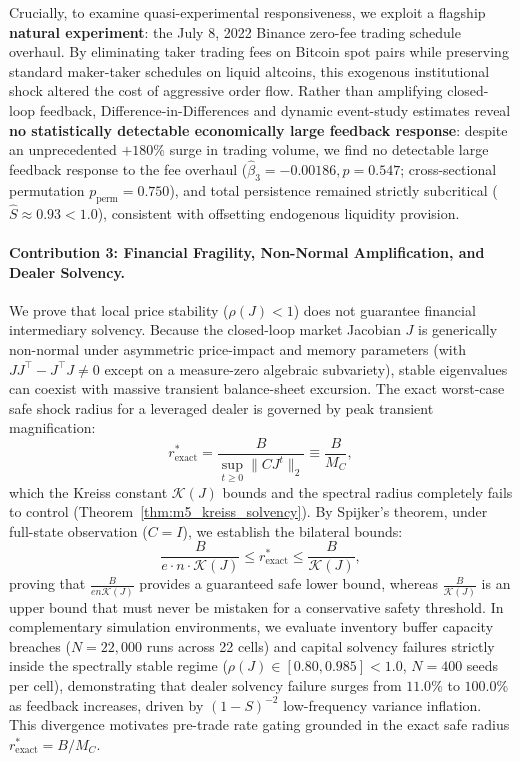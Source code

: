 \documentclass[12pt]{article}
\theoremstyle{definition}
\theoremstyle{remark}
\begin{document}
Crucially, to examine quasi-experimental responsiveness, we exploit a flagship \textbf{natural experiment}: the July 8, 2022 Binance zero-fee trading schedule overhaul. By eliminating taker trading fees on Bitcoin spot pairs while preserving standard maker-taker schedules on liquid altcoins, this exogenous institutional shock altered the cost of aggressive order flow. Rather than amplifying closed-loop feedback, Difference-in-Differences and dynamic event-study estimates reveal \textbf{no statistically detectable economically large feedback response}: despite an unprecedented $+180\%$ surge in trading volume, we find no detectable large feedback response to the fee overhaul ($\hat{\beta}_3 = -0.00186, p = 0.547$; cross-sectional permutation $p_{\text{perm}} = 0.750$), and total persistence remained strictly subcritical ($\hat{S} \approx 0.93 < 1.0$), consistent with offsetting endogenous liquidity provision.

\paragraph{Contribution 3: Financial Fragility, Non-Normal Amplification, and Dealer Solvency.}
We prove that local price stability ($\rho(J) < 1$) does not guarantee financial intermediary solvency. Because the closed-loop market Jacobian $J$ is generically non-normal under asymmetric price-impact and memory parameters (with $J J^\top - J^\top J \neq 0$ except on a measure-zero algebraic subvariety), stable eigenvalues can coexist with massive transient balance-sheet excursion. The exact worst-case safe shock radius for a leveraged dealer is governed by peak transient magnification:
\begin{equation}
r^*_{\text{exact}} = \frac{B}{\sup_{t \ge 0} \|C J^t\|_2} \equiv \frac{B}{M_C},
\end{equation}
which the Kreiss constant $\mathcal{K}(J)$ bounds and the spectral radius completely fails to control (Theorem~\ref{thm:m5_kreiss_solvency}). By Spijker's theorem, under full-state observation ($C = I$), we establish the bilateral bounds:
\begin{equation}
\frac{B}{e \cdot n \cdot \mathcal{K}(J)} \le r^*_{\text{exact}} \le \frac{B}{\mathcal{K}(J)},
\end{equation}
proving that $\frac{B}{e n \mathcal{K}(J)}$ provides a guaranteed safe lower bound, whereas $\frac{B}{\mathcal{K}(J)}$ is an upper bound that must never be mistaken for a conservative safety threshold. In complementary simulation environments, we evaluate inventory buffer capacity breaches ($N = 22{,}000$ runs across 22 cells) and capital solvency failures strictly inside the spectrally stable regime ($\rho(J) \in [0.80, 0.985] < 1.0$, $N = 400$ seeds per cell), demonstrating that dealer solvency failure surges from $11.0\%$ to $100.0\%$ as feedback increases, driven by $(1 - S)^{-2}$ low-frequency variance inflation. This divergence motivates pre-trade rate gating grounded in the exact safe radius $r^*_{\text{exact}} = B/M_C$.
\end{document}

